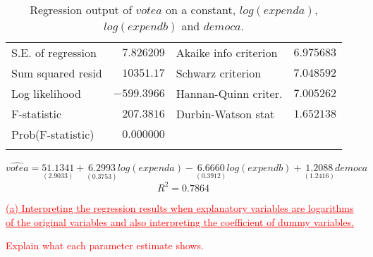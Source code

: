 \documentclass[12pt]{report}
\begin{document}
\begin{table}[H]
\begin{tabular}{lrrrr}
		\multicolumn{1}{l}{S.E. of regression}&\multicolumn{1}{r}{$7.826209$}&\multicolumn{2}{l}{Akaike info criterion}&\multicolumn{1}{r}{$6.975683$}\\
		\multicolumn{1}{l}{Sum squared resid}&\multicolumn{1}{r}{$10351.17$}&\multicolumn{2}{l}{Schwarz criterion}&\multicolumn{1}{r}{$7.048592$}\\
		\multicolumn{1}{l}{Log likelihood}&\multicolumn{1}{r}{$-599.3966$}&\multicolumn{2}{l}{Hannan-Quinn criter.}&\multicolumn{1}{r}{$7.005262$}\\
		\multicolumn{1}{l}{F-statistic}&\multicolumn{1}{r}{$207.3816$}&\multicolumn{2}{l}{Durbin-Watson stat}&\multicolumn{1}{r}{$1.652138$}\\
		\multicolumn{1}{l}{Prob(F-statistic)}&\multicolumn{1}{r}{$0.000000$}&\multicolumn{1}{c}{}&\multicolumn{1}{c}{}&\multicolumn{1}{c}{}\\
		[4.5pt] \hline \\ [-4.5pt]
	\end{tabular}
	\caption{Regression output of $votea$ on a constant, $log(expenda)$, $log(expendb)$ and $democa$.}
\end{table} \vspace{-\baselineskip}
\centering $\widehat{votea} = \underset{(2.9033)}{51.1341} + \underset{(0.3753)}{6.2993}log(expenda) - \underset{(0.3912)}{6.6660}log(expendb) + \underset{(1.2416)}{1.2088}democa$
$$R^2 = 0.7864$$

\newpage
\justify \noindent \textcolor{red}
{
	\uline{(a) Interpreting the regression results when explanatory variables are logarithms of the original variables and also interpreting the coefficient of dummy variables.}
}

\noindent \textcolor{red}
{
	Explain what each parameter estimate shows.
}
\end{document}
